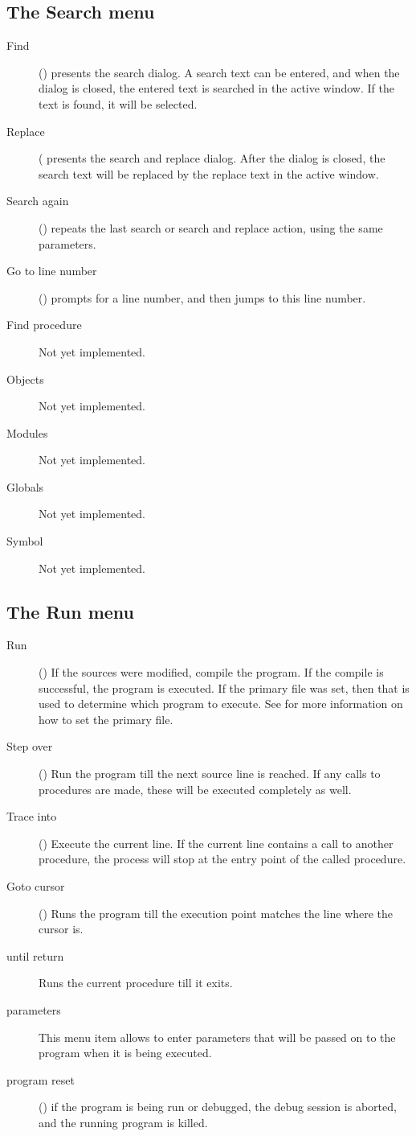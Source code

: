 \subsection{The Search menu}
\label{se:menusearch}
\begin{description}
\item[Find] () presents the search dialog. A search text 
can be entered, and when the dialog is closed, the entered text is searched
in the active window. If the text is found, it will be selected. 
\item[Replace] ( presents the search and replace dialog.
After the dialog is closed, the search text will be replaced by the replace
text in the active window.
\item[Search again] () repeats the last search or search and replace action,
 using  the same parameters.
\item[Go to line number] () prompts for a line number, and
then jumps to this line number.
\item[Find procedure]
Not yet implemented.
\item[Objects]
Not yet implemented.
\item[Modules]
Not yet implemented.
\item[Globals]
Not yet implemented.
\item[Symbol]
Not yet implemented.
\end{description}
%
%
\subsection{The Run menu}
\label{se:menurun}
\begin{description}
\item[Run] ()
If the sources were modified, compile the program. If the compile is
successful, the program is executed. If the primary file  was set, then 
that is used to determine which program to execute. See 
for more information on how to set the primary file.
\item[Step over] ()
Run the program till the next source line is reached. If any calls to 
procedures are made, these will be executed completely as well.
\item[Trace into] ()
Execute the current line. If the current line contains a call to another
procedure, the process will stop at the entry point of the called procedure.
\item[Goto cursor] ()
Runs the program till the execution point matches the line where the cursor
is.
\item[until return]
Runs the current procedure till it exits.
\item[parameters]
This menu item allows to enter parameters that will be passed on to the
program when it is being executed.
\item[program reset] () if the program is being run or 
debugged, the debug session is aborted, and the running program is killed.
\end{description}
%
%
